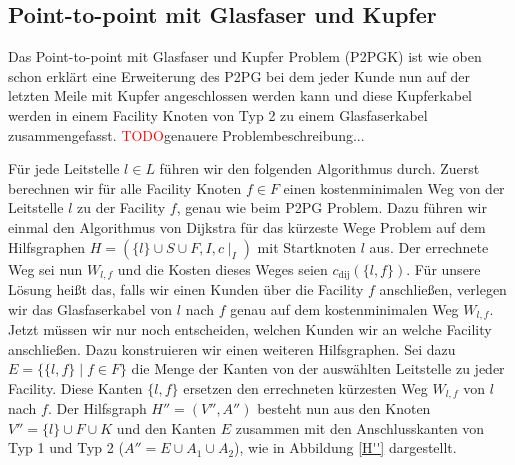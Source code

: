 \documentclass[11pt,a4paper]{article}
\newcommand{\TODO}{\textcolor{red}{TODO}}
\theoremstyle{my_th_style1}
\begin{document}
\subsection{Point-to-point mit Glasfaser und Kupfer}
Das Point-to-point mit Glasfaser und Kupfer Problem (P2PGK) ist wie oben schon erklärt eine Erweiterung des P2PG bei dem jeder Kunde nun auf der letzten Meile mit Kupfer angeschlossen werden kann und diese Kupferkabel werden in einem Facility Knoten von Typ 2 zu einem Glasfaserkabel zusammengefasst. \TODO genauere Problembeschreibung...


Für jede Leitstelle $l \in L$ führen wir den folgenden Algorithmus durch.
Zuerst berechnen wir für alle Facility Knoten $f \in F$ einen kostenminimalen Weg von der Leitstelle $l$ zu der Facility $f$, genau wie beim P2PG Problem. Dazu führen wir einmal den Algorithmus von Dijkstra für das kürzeste Wege Problem auf dem Hilfsgraphen $H=(\{l\} \cup S \cup F , I,c\mid_I)$ mit Startknoten $l$ aus. Der errechnete Weg sei nun $W_{l,f}$ und die Kosten dieses Weges seien $c_{\text{dij}}(\{l,f\})$.
Für unsere Lösung heißt das, falls wir einen Kunden über die Facility $f$ anschließen, verlegen wir das Glasfaserkabel von $l$ nach $f$ genau auf dem kostenminimalen Weg $W_{l,f}$.  Jetzt müssen wir nur noch entscheiden, welchen Kunden wir an welche Facility anschließen.
Dazu konstruieren wir einen weiteren Hilfsgraphen. Sei dazu $E=\{\{l,f  \} \mid f \in F  \}$ die Menge der Kanten von der auswählten Leitstelle zu jeder Facility. Diese Kanten $\{l,f\}$ ersetzen den errechneten kürzesten Weg $W_{l,f}$ von $l$ nach $f$. Der Hilfsgraph $H''=(V'',A'')$ besteht nun aus den Knoten $V''=\{l\} \cup F \cup K$ und den Kanten $E$ zusammen mit den Anschlusskanten von Typ 1 und Typ 2 ($A''=E \cup A_1 \cup A_2$), wie in Abbildung \ref{H''} dargestellt.
\end{document}
